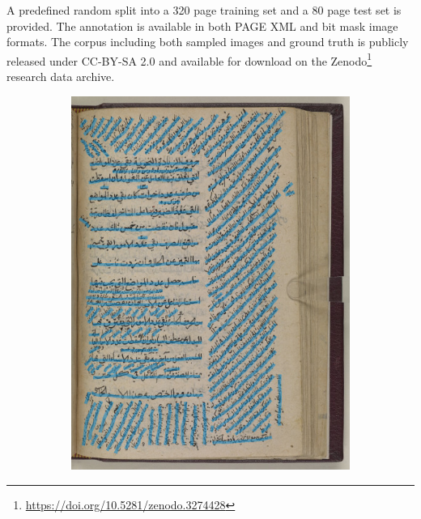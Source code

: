 A predefined random split into a 320 page training set and a 80 page test set
is provided. The annotation is available in both PAGE XML and bit mask image
formats.  The corpus including both sampled images and ground truth is publicly
released under CC-BY-SA 2.0 and available for download on the 
Zenodo\footnote{\url{https://doi.org/10.5281/zenodo.3274428}} research data archive.

\begin{figure}[]
	\begin{subfigure}[b]{.475\columnwidth}
		\centering
		\includegraphics[width=\textwidth]{curved.jpg}
	\end{subfigure}
	\hfill
	\begin{subfigure}[b]{.475\columnwidth}
		\centering

\end{subfigure}
\end{figure}
